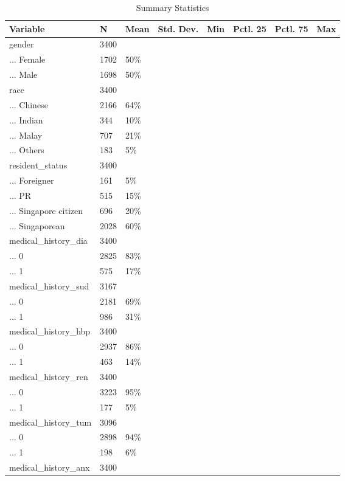 \documentclass[
]{article}
\begin{document}
\begin{table}
\caption{\label{tab:unnamed-chunk-9}Summary Statistics}
\centering
\begin{tabular}[t]{llllllll}
\toprule
Variable & N & Mean & Std. Dev. & Min & Pctl. 25 & Pctl. 75 & Max\\
\midrule
gender & 3400 &  &  &  &  &  & \\
... Female & 1702 & 50\% &  &  &  &  & \\
... Male & 1698 & 50\% &  &  &  &  & \\
race & 3400 &  &  &  &  &  & \\
... Chinese & 2166 & 64\% &  &  &  &  & \\
\addlinespace
... Indian & 344 & 10\% &  &  &  &  & \\
... Malay & 707 & 21\% &  &  &  &  & \\
... Others & 183 & 5\% &  &  &  &  & \\
resident\_status & 3400 &  &  &  &  &  & \\
... Foreigner & 161 & 5\% &  &  &  &  & \\
\addlinespace
... PR & 515 & 15\% &  &  &  &  & \\
... Singapore citizen & 696 & 20\% &  &  &  &  & \\
... Singaporean & 2028 & 60\% &  &  &  &  & \\
medical\_history\_dia & 3400 &  &  &  &  &  & \\
... 0 & 2825 & 83\% &  &  &  &  & \\
\addlinespace
... 1 & 575 & 17\% &  &  &  &  & \\
medical\_history\_sud & 3167 &  &  &  &  &  & \\
... 0 & 2181 & 69\% &  &  &  &  & \\
... 1 & 986 & 31\% &  &  &  &  & \\
medical\_history\_hbp & 3400 &  &  &  &  &  & \\
\addlinespace
... 0 & 2937 & 86\% &  &  &  &  & \\
... 1 & 463 & 14\% &  &  &  &  & \\
medical\_history\_ren & 3400 &  &  &  &  &  & \\
... 0 & 3223 & 95\% &  &  &  &  & \\
... 1 & 177 & 5\% &  &  &  &  & \\
\addlinespace
medical\_history\_tum & 3096 &  &  &  &  &  & \\
... 0 & 2898 & 94\% &  &  &  &  & \\
... 1 & 198 & 6\% &  &  &  &  & \\
medical\_history\_anx & 3400 &  &  &  &  &  & \\

\end{tabular}
\end{table}
\end{document}
